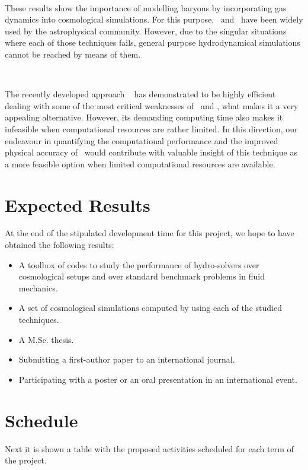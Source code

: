 \documentclass[a4,useAMS,usenatbib,usegraphicx,12pt]{article}
\begin{document}
\

These results show the importance of modelling baryons by incorporating gas 
dynamics into cosmological simulations. For this purpose, \AMR\ and \SPH\ have
been widely used by the astrophysical community. However, due to the singular 
situations where each of those techniques fails, general purpose hydrodynamical
simulations cannot be reached by means of them.

\

The recently developed approach \AREPO\ \citet{Springel10} has demonstrated to 
be highly efficient dealing with some of the most critical weaknesses of \AMR\ 
and \SPH, what makes it a very appealing alternative. However, its demanding 
computing time also makes it infeasible when computational resources are rather 
limited. In this direction, our endeavour in quantifying the computational 
performance and the improved physical accuracy of \VPH\ would contribute with 
valuable insight of this technique as a more feasible option when limited 
computational resources are available.


\section{Expected Results}
At the end of the stipulated development time for this project, we hope to have
obtained the following results:
\begin{itemize}
\item A toolbox of codes to study the performance of hydro-solvers over 
cosmological setups and over standard benchmark problems in fluid mechanics.
\item A set of cosmological simulations computed by using each of the studied
techniques.
\item A M.Sc. thesis.
\item Submitting a first-author paper to an international journal.
\item Participating with a poster or an oral presentation in an international
event.
\end{itemize}


\section{Schedule}
Next it is shown a table with the proposed activities scheduled for each term
of the project.
\end{document}
